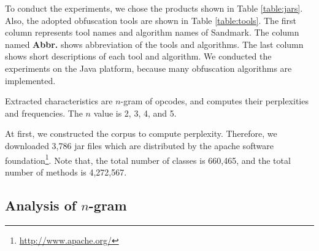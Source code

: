 \documentclass[conference]{IEEEtran}
\begin{document}
To conduct the experiments, we chose the products shown in Table
\ref{table:jars}.  Also, the adopted obfuscation tools are shown in
Table \ref{table:tools}.  The first column represents tool names and
algorithm names of Sandmark.  The column named \textbf{Abbr.} shows
abbreviation of the tools and algorithms.  The last column shows short
descriptions of each tool and algorithm.
%
We conducted the experiments on the Java platform, because many
obfuscation algorithms are implemented.

Extracted characteristics are $n$-gram of opcodes, and computes their
perplexities and frequencies.  The $n$ value is 2, 3, 4, and 5.


At first, we constructed the corpus to compute perplexity.
Therefore, we downloaded 3,786 jar files which are distributed by the
apache software foundation\footnote[4]{\url{http://www.apache.org/}}.
Note that, the total number of classes is 660,465, and the total
number of methods is 4,272,567.

\subsection{Analysis of $n$-gram}\label{sect:rq1}
\end{document}
